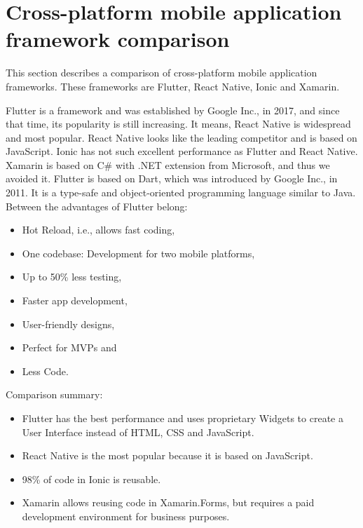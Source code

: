 \section{Cross-platform mobile application framework comparison}\label{sec:cross-platform-mobile-application-framework-comparison}
This section describes a comparison of cross-platform mobile application frameworks.
These frameworks are Flutter, React Native, Ionic and Xamarin.

Flutter is a framework and was established by Google Inc., in 2017, and since that time, its popularity is still increasing.
It means, React Native is widespread and most popular.
React Native looks like the leading competitor and is based on JavaScript.\cite{flutterVsReactNativeNevercodeIo}
Ionic has not such excellent performance as Flutter and React Native.\cite{crossPlatformFrameworokComparation}
Xamarin is based on C\# with .NET extension from Microsoft, and thus we avoided it.
Flutter is based on Dart, which was introduced by Google Inc., in 2011.
It is a type-safe and object-oriented programming language similar to Java.\cite{dartTypeSystem}
Between the advantages of Flutter belong:
\begin{itemize}
    \item Hot Reload, i.e., allows fast coding,
    \item One codebase: Development for two mobile platforms,
    \item Up to 50\% less testing,
    \item Faster app development,
    \item User-friendly designs,
    \item Perfect for MVPs and
    \item Less Code.\cite{flutterVsReactNativeHackrIo}
\end{itemize}
Comparison summary:
\begin{itemize}
    \item Flutter has the best performance and uses proprietary Widgets to create a User Interface instead of HTML, CSS and JavaScript.
    \item React Native is the most popular because it is based on JavaScript.
    \item 98\% of code in Ionic is reusable.
    \item Xamarin allows reusing code in Xamarin.Forms, but requires a paid development environment for business purposes.
\end{itemize}